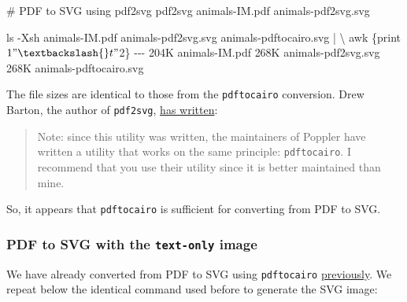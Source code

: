 \documentclass[
  12pt,
  british,
  a4paper,
  rgb,
  dvipsnames,
  svgnames,
  hyphens]{article}
\newenvironment{Shaded}{\begin{snugshade}}{\end{snugshade}}
\newcommand{\AttributeTok}[1]{\textcolor[rgb]{0.80,0.80,0.80}{#1}}
\newcommand{\CommentTok}[1]{\textcolor[rgb]{0.50,0.62,0.50}{#1}}
\newcommand{\DataTypeTok}[1]{\textcolor[rgb]{0.87,0.87,0.75}{#1}}
\newcommand{\ExtensionTok}[1]{\textcolor[rgb]{0.80,0.80,0.80}{#1}}
\newcommand{\FunctionTok}[1]{\textcolor[rgb]{0.94,0.94,0.56}{#1}}
\newcommand{\KeywordTok}[1]{\textcolor[rgb]{0.94,0.87,0.69}{#1}}
\newcommand{\NormalTok}[1]{\textcolor[rgb]{0.80,0.80,0.80}{#1}}
\newcommand{\StringTok}[1]{\textcolor[rgb]{0.80,0.58,0.58}{#1}}
\begin{document}
\begin{Shaded}
\begin{Highlighting}[]
\CommentTok{\# PDF to SVG using pdf2svg}
\ExtensionTok{pdf2svg}\NormalTok{ animals{-}IM.pdf animals{-}pdf2svg.svg}

\FunctionTok{ls} \AttributeTok{{-}Xsh}\NormalTok{ animals{-}IM.pdf animals{-}pdf2svg.svg animals{-}pdftocairo.svg }\KeywordTok{|} \DataTypeTok{\textbackslash{}}
\FunctionTok{awk} \StringTok{\textquotesingle{}\{print $1 "\textbackslash{}t" $2\}\textquotesingle{}}
\ExtensionTok{{-}{-}{-}}
\ExtensionTok{204K}\NormalTok{    animals{-}IM.pdf}
\ExtensionTok{268K}\NormalTok{    animals{-}pdf2svg.svg}
\ExtensionTok{268K}\NormalTok{    animals{-}pdftocairo.svg}
\end{Highlighting}
\end{Shaded}

The file sizes are identical to those from the \texttt{pdftocairo}
conversion. Drew Barton, the author of \texttt{pdf2svg},
\href{https://cityinthesky.co.uk/opensource/pdf2svg/}{has written}:

\begin{quote}
Note: since this utility was written, the maintainers of Poppler have
written a utility that works on the same principle: \texttt{pdftocairo}.
I recommend that you use their utility since it is better maintained
than mine.
\end{quote}

So, it appears that \texttt{pdftocairo} is sufficient for converting
from PDF to SVG.

\hypertarget{pdf-to-svg-with-the-text-only-image}{%
\subsubsection{\texorpdfstring{PDF to SVG with the \texttt{text-only}
image}{PDF to SVG with the text-only image}}\label{pdf-to-svg-with-the-text-only-image}}

We have already converted from PDF to SVG using \texttt{pdftocairo}
\protect\hyperlink{generating-an-svg-from-a-pdf}{previously}. We repeat
below the identical command used before to generate the SVG image:
\end{document}
